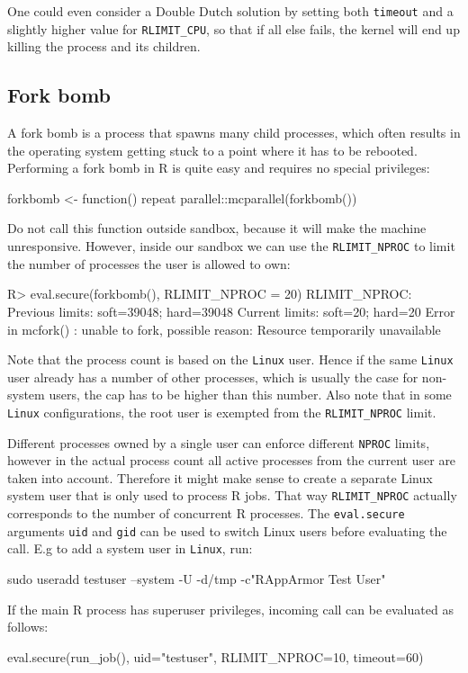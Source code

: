 \documentclass{jss}
\newcommand{\R}{\textsf{R}\xspace}
\newcommand{\Linux}{\texttt{Linux}\xspace}
\begin{document}
\begin{appendices}
One could even consider a Double Dutch solution by setting both \texttt{timeout}
and a slightly higher value for \texttt{RLIMIT\_CPU}, so that if all else fails,
the kernel will end up killing the process and its children.

\subsection{Fork bomb}

A fork bomb is a process that spawns many child processes, which often results
in the operating system getting stuck to a point where it has to be rebooted.
Performing a fork bomb in \R is quite easy and requires no special privileges:
\begin{CodeChunk}
\begin{CodeInput}
forkbomb <- function(){
  repeat{
    parallel::mcparallel(forkbomb())
  }
}
\end{CodeInput}
\end{CodeChunk}
Do not call this function outside sandbox, because it will make the machine
unresponsive. However, inside our sandbox we can use the \texttt{RLIMIT\_NPROC}
to limit the number of processes the user is allowed to own:
\begin{CodeChunk}
\begin{CodeInput}
R> eval.secure(forkbomb(), RLIMIT_NPROC = 20)
RLIMIT_NPROC:
Previous limits: soft=39048; hard=39048
Current limits: soft=20; hard=20
Error in mcfork() :
  unable to fork, possible reason: Resource temporarily unavailable
\end{CodeInput}
\end{CodeChunk}
Note that the process count is based on the \Linux user. Hence if the same
\Linux user already has a number of other processes, which is usually the case for
non-system users, the cap has to be higher than this number. Also note
that in some \Linux configurations, the root user is exempted from the
\texttt{RLIMIT\_NPROC} limit.

Different processes owned by a single user can enforce different \texttt{NPROC}
limits, however in the actual process count all active processes from the
current user are taken into account. Therefore it might make sense to create a
separate Linux system user that is only used to process \R jobs. That way
\texttt{RLIMIT\_NPROC} actually corresponds to the number of concurrent \R
processes. The \texttt{eval.secure} arguments \texttt{uid} and \texttt{gid}
can be used to switch Linux users before evaluating the call. E.g to add a
system user in \Linux, run:
\begin{CodeChunk}
\begin{CodeInput}
sudo useradd testuser --system -U -d/tmp -c"RAppArmor Test User"
\end{CodeInput}
\end{CodeChunk}
If the main \R process has superuser privileges, incoming call can be
evaluated as follows:
\begin{CodeChunk}
\begin{CodeInput}
eval.secure(run_job(), uid="testuser", RLIMIT_NPROC=10, timeout=60)
\end{CodeInput}
\end{CodeChunk}



\end{appendices}
\end{document}
